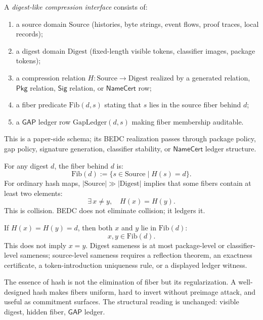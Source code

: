 \begin{definition}
\label{def:hash-like-digest-compression-interface}
A \emph{digest-like compression interface} consists of:
\begin{enumerate}
\item a source domain $\mathrm{Source}$ (histories, byte strings, event flows, proof traces, local records);
\item a digest domain $\mathrm{Digest}$ (fixed-length visible tokens, classifier images, package tokens);
\item a compression relation $H : \mathrm{Source} \to \mathrm{Digest}$ realized by a generated relation, $\mathsf{Pkg}$ relation, $\mathsf{Sig}$ relation, or $\mathsf{NameCert}$ row;
\item a fiber predicate $\mathrm{Fib}(d, s)$ stating that $s$ lies in the source fiber behind $d$;
\item a $\mathsf{GAP}$ ledger row $\mathrm{GapLedger}(d, s)$ making fiber membership auditable.
\end{enumerate}
This is a paper-side schema; its BEDC realization passes through package policy, gap policy, signature generation, classifier stability, or $\mathsf{NameCert}$ ledger structure.
\end{definition}

For any digest $d$, the fiber behind $d$ is:
$$
\mathrm{Fib}(d) := \{ s \in \mathrm{Source} \mid H(s) = d \}.
$$
For ordinary hash maps, $|\mathrm{Source}| \gg |\mathrm{Digest}|$ implies that some fibers contain at least two elements:
$$
\exists\, x \neq y,\quad H(x) = H(y).
$$
This is collision. BEDC does not eliminate collision; it ledgers it.

\begin{principle}
\label{prin:hash-like-digest-not-source}
If $H(x) = H(y) = d$, then both $x$ and $y$ lie in $\mathrm{Fib}(d)$:
$$
x, y \in \mathrm{Fib}(d).
$$
This does not imply $x = y$. Digest sameness is at most package-level or classifier-level sameness; source-level sameness requires a reflection theorem, an exactness certificate, a token-introduction uniqueness rule, or a displayed ledger witness.
\end{principle}

\begin{remark}
\label{rem:hash-like-controlled-fiber-generator}
The essence of hash is not the elimination of fiber but its regularization. A well-designed hash makes fibers uniform, hard to invert without preimage attack, and useful as commitment surfaces. The structural reading is unchanged: visible digest, hidden fiber, $\mathsf{GAP}$ ledger.
\end{remark}

